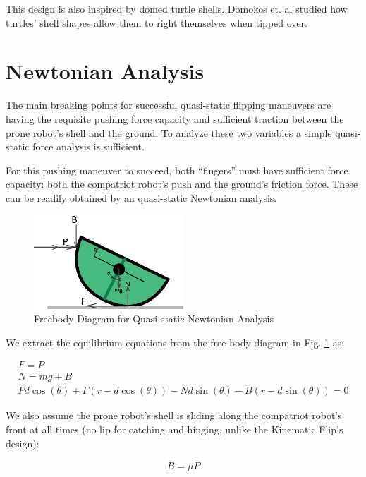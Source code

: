 \documentclass[letterpaper]{report}
\begin{document}
This design is also inspired by domed turtle shells. Domokos et. al \cite{domokos2008geometry} studied how turtles' shell shapes allow them to right themselves when tipped over.

\section{Newtonian Analysis}
The main breaking points for successful quasi-static flipping maneuvers are having the requisite pushing force capacity and sufficient traction between the prone robot's shell and the ground.
To analyze these two variables a simple quasi-static force analysis is sufficient.

For this pushing maneuver to succeed, both ``fingers'' must have sufficient force capacity: both the compatriot robot's push and the ground's friction force.
These can be readily obtained by an quasi-static Newtonian analysis.

\begin{figure}[ht]
\centering
\includegraphics[width=0.5\textwidth]{QS_FreeBodyDiagram2.eps}
\caption{\label{f:QS_FBD}Freebody Diagram for Quasi-static Newtonian Analysis}
\end{figure}

We extract the equilibrium equations from the free-body diagram in Fig. \ref{f:QS_FBD} as:

\begin{align}
  F = P \label{e:QSF_x} \\
  N = mg + B \label{e:QSF_y} \\
  P d \cos(\theta) + F(r - d \cos(\theta)) - N d \sin(\theta) - B (r - d \sin(\theta)) = 0 \label{e:QSF_o}
\end{align}

We also assume the prone robot's shell is sliding along the compatriot robot's front at all times (no lip for catching and hinging, unlike the Kinematic Flip's design):

\begin{align}
  B = \mu P \label{e:QSF_plowFriction}
\end{align}
\end{document}
